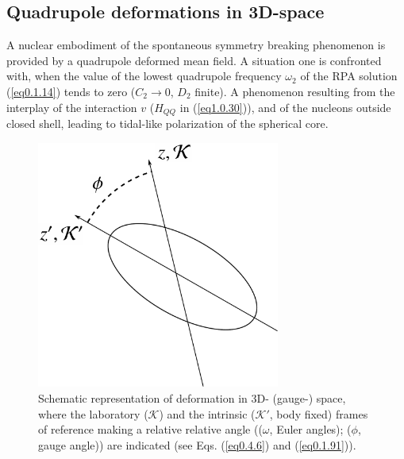 \subsection{Quadrupole deformations in 3D-space}
A nuclear embodiment of the spontaneous symmetry breaking phenomenon is provided by a quadrupole deformed  mean field. A situation one is confronted with, when the value of the lowest quadrupole frequency $\omega_2$ of the RPA solution (\ref{eq0.1.14}) tends to zero ($C_2\to0$, $D_2$ finite). A phenomenon resulting from the interplay of the interaction $v$ ($H_{QQ}$ in (\ref{eq1.0.30})), and of the nucleons outside closed shell, leading to tidal-like polarization of the spherical core.
\begin{figure}
	\centerline {
		\includegraphics*[width=8cm, angle=0.]{introduccion/figs/fig0_4_4}
	}
	\caption{Schematic representation of deformation in  3D- (gauge-) space, where the laboratory ($\mathcal K$) and the intrinsic ($\mathcal K'$, body fixed) frames of reference making a relative relative angle (($\omega$, Euler angles); ($\phi$, gauge angle)) are  indicated (see Eqs. (\ref{eq0.4.6}) and (\ref{eq0.1.91})).}
	\label{fig0.4.4}
\end{figure}
